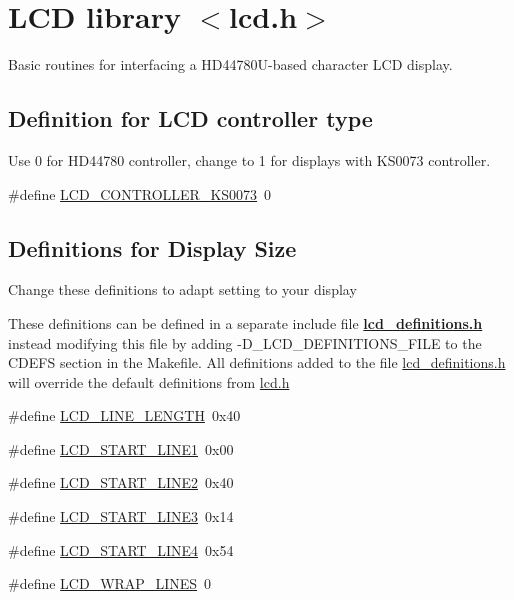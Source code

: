 \hypertarget{group__pfleury__lcd}{}\section{L\+CD library $<$lcd.\+h$>$}
\label{group__pfleury__lcd}


Basic routines for interfacing a H\+D44780\+U-\/based character L\+CD display.  


\subsection*{Definition for L\+CD controller type}
\label{_amgrp9cebaa2a52e46760a474a1905c7f53a9}%
Use 0 for H\+D44780 controller, change to 1 for displays with K\+S0073 controller. \begin{DoxyCompactItemize}
\item 
\#define \hyperlink{group__pfleury__lcd_ga63574b03f72a197aeee823aae95dc3b7}{L\+C\+D\+\_\+\+C\+O\+N\+T\+R\+O\+L\+L\+E\+R\+\_\+\+K\+S0073}~0
\end{DoxyCompactItemize}
\subsection*{Definitions for Display Size}
\label{_amgrpcaec0cb1262819d89ffa7f25526cc869}%
Change these definitions to adapt setting to your display

These definitions can be defined in a separate include file {\bfseries \hyperlink{lcd__definitions_8h_source}{lcd\+\_\+definitions.\+h}} instead modifying this file by adding -\/\+D\+\_\+\+L\+C\+D\+\_\+\+D\+E\+F\+I\+N\+I\+T\+I\+O\+N\+S\+\_\+\+F\+I\+LE to the C\+D\+E\+FS section in the Makefile. All definitions added to the file \hyperlink{lcd__definitions_8h_source}{lcd\+\_\+definitions.\+h} will override the default definitions from \hyperlink{lcd_8h}{lcd.\+h} \begin{DoxyCompactItemize}
\item 
\#define \hyperlink{group__pfleury__lcd_gae59a728d9dee9f12c817b29d38746ed9}{L\+C\+D\+\_\+\+L\+I\+N\+E\+\_\+\+L\+E\+N\+G\+TH}~0x40
\item 
\#define \hyperlink{group__pfleury__lcd_gabd056d70a1488ea2eb1aef87e248e234}{L\+C\+D\+\_\+\+S\+T\+A\+R\+T\+\_\+\+L\+I\+N\+E1}~0x00
\item 
\#define \hyperlink{group__pfleury__lcd_ga7b317b21058ef031716ba040ef75430a}{L\+C\+D\+\_\+\+S\+T\+A\+R\+T\+\_\+\+L\+I\+N\+E2}~0x40
\item 
\#define \hyperlink{group__pfleury__lcd_gae7cca16353048a062baeb3a52da55249}{L\+C\+D\+\_\+\+S\+T\+A\+R\+T\+\_\+\+L\+I\+N\+E3}~0x14
\item 
\#define \hyperlink{group__pfleury__lcd_gab1b73e05bdb5cc12cdff5a1cf6c4f2a2}{L\+C\+D\+\_\+\+S\+T\+A\+R\+T\+\_\+\+L\+I\+N\+E4}~0x54
\item 
\#define \hyperlink{group__pfleury__lcd_gadb35ff6cb242e48ba0545ea919ffc5d3}{L\+C\+D\+\_\+\+W\+R\+A\+P\+\_\+\+L\+I\+N\+ES}~0
\end{DoxyCompactItemize}

